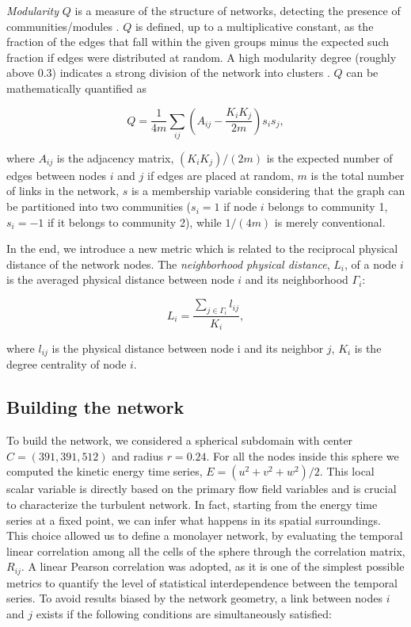 \documentclass{ws-ijbc}
\begin{document}
\noindent \emph{Modularity} $Q$ is a measure of the structure of networks, detecting the presence of communities/modules \cite{newman2004}. $Q$ is defined, up to a multiplicative constant, as the fraction of the edges that fall within the given groups minus the expected such fraction if edges were distributed at random. A high modularity degree (roughly above 0.3) indicates a strong division of the network into clusters \cite{newman2006}. $Q$ can be mathematically quantified as

\begin{equation}
Q = \frac{1}{4 m} \sum_{ij} \left(A_{ij} - \frac{K_i K_j}{2 m} \right) s_i s_j,
\end{equation}

\noindent where $A_{ij}$ is the adjacency matrix, $(K_i K_j)/(2 m)$ is the expected number of edges between nodes $i$ and $j$ if edges are placed at random, $m$ is the total number of links in the network, $s$ is a membership variable considering that the graph can be partitioned into two communities ($s_i=1$ if node $i$ belongs to community 1, $s_i=-1$ if it belongs to community 2), while $1/(4m)$ is merely conventional.

\noindent In the end, we introduce a new metric which is related to the reciprocal physical distance of the network nodes. The \emph{neighborhood physical distance}, $L_i$, of a node $i$ is the averaged physical distance between node $i$ and its neighborhood $\Gamma_i$:

\begin{equation}
L_i = \frac{\sum\limits_{j \in \Gamma_i} l_{ij}}{K_i},
\end{equation}

\noindent where $l_{ij}$ is the physical distance between node i and its neighbor $j$, $K_i$ is the degree centrality of node $i$.

\subsection{Building the network}

To build the network, we considered a spherical subdomain with center $C=(391,391,512)$ and radius $r=0.24$. For all the nodes inside this sphere we computed the kinetic energy time series, $E =(u^2 +v^2 + w^2)/2$. This local scalar variable is directly based on the primary flow field variables and is crucial to characterize the turbulent network. In fact, starting from the energy time series at a fixed point, we can infer what happens in its spatial surroundings. This choice allowed us to define a monolayer network, by evaluating the temporal linear correlation among all the cells of the sphere through the correlation matrix, $R_{ij}$. A linear Pearson correlation was adopted, as it is one of the simplest possible metrics to quantify the level of statistical interdependence between the temporal series. To avoid results biased by the network geometry, a link between nodes $i$ and $j$ exists if the following conditions are simultaneously satisfied:
\end{document}
